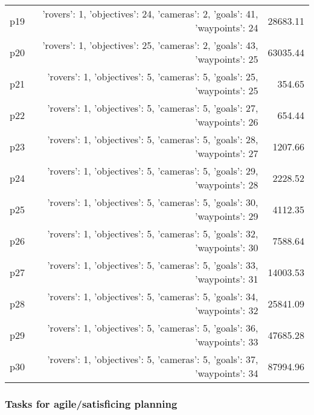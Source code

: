 \documentclass{article}
\begin{document}
\begin{center}
\begin{tabular}{@{}l|r|r@{}}
  p19&{'rovers': 1, 'objectives': 24, 'cameras': 2, 'goals': 41, 'waypoints': 24}&28683.11\\
  p20&{'rovers': 1, 'objectives': 25, 'cameras': 2, 'goals': 43, 'waypoints': 25}&63035.44\\
  p21&{'rovers': 1, 'objectives': 5, 'cameras': 5, 'goals': 25, 'waypoints': 25}&354.65\\
  p22&{'rovers': 1, 'objectives': 5, 'cameras': 5, 'goals': 27, 'waypoints': 26}&654.44\\
  p23&{'rovers': 1, 'objectives': 5, 'cameras': 5, 'goals': 28, 'waypoints': 27}&1207.66\\
  p24&{'rovers': 1, 'objectives': 5, 'cameras': 5, 'goals': 29, 'waypoints': 28}&2228.52\\
  p25&{'rovers': 1, 'objectives': 5, 'cameras': 5, 'goals': 30, 'waypoints': 29}&4112.35\\
  p26&{'rovers': 1, 'objectives': 5, 'cameras': 5, 'goals': 32, 'waypoints': 30}&7588.64\\
  p27&{'rovers': 1, 'objectives': 5, 'cameras': 5, 'goals': 33, 'waypoints': 31}&14003.53\\
  p28&{'rovers': 1, 'objectives': 5, 'cameras': 5, 'goals': 34, 'waypoints': 32}&25841.09\\
  p29&{'rovers': 1, 'objectives': 5, 'cameras': 5, 'goals': 36, 'waypoints': 33}&47685.28\\
  p30&{'rovers': 1, 'objectives': 5, 'cameras': 5, 'goals': 37, 'waypoints': 34}&87994.96
                            \end{tabular}
                            \end{center}
                    

                                \subsubsection*{Tasks for agile/satisficing planning}
                                
\end{document}
